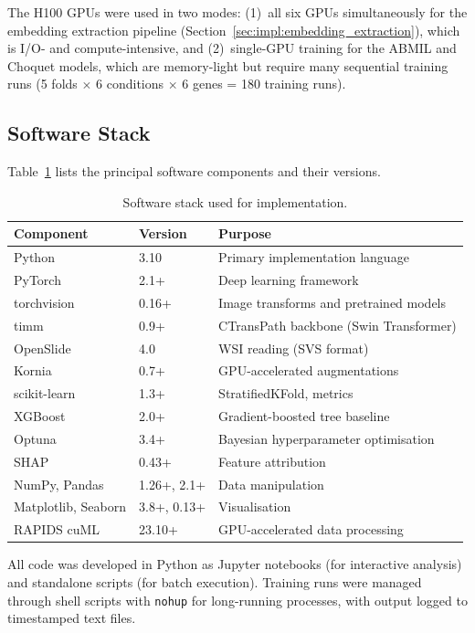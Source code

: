 The H100 GPUs were used in two modes: (1)~all six GPUs simultaneously for the embedding extraction pipeline (Section~\ref{sec:impl:embedding_extraction}), which is I/O- and compute-intensive, and (2)~single-GPU training for the ABMIL and Choquet models, which are memory-light but require many sequential training runs (5 folds $\times$ 6 conditions $\times$ 6 genes = 180 training runs).

\subsection{Software Stack}
\label{sec:impl:software}

Table~\ref{tab:software_stack} lists the principal software components and their versions.

\begin{table}[ht!]
\centering
\caption{Software stack used for implementation.}
\label{tab:software_stack}
\begin{tabular}{l l l}
\hline
\textbf{Component} & \textbf{Version} & \textbf{Purpose} \\
\hline
Python & 3.10 & Primary implementation language \\
PyTorch & 2.1+ & Deep learning framework \\
torchvision & 0.16+ & Image transforms and pretrained models \\
timm & 0.9+ & CTransPath backbone (Swin Transformer) \\
OpenSlide & 4.0 & WSI reading (SVS format) \\
Kornia & 0.7+ & GPU-accelerated augmentations \\
scikit-learn & 1.3+ & StratifiedKFold, metrics \\
XGBoost & 2.0+ & Gradient-boosted tree baseline \\
Optuna & 3.4+ & Bayesian hyperparameter optimisation \\
SHAP & 0.43+ & Feature attribution \\
NumPy, Pandas & 1.26+, 2.1+ & Data manipulation \\
Matplotlib, Seaborn & 3.8+, 0.13+ & Visualisation \\
RAPIDS cuML & 23.10+ & GPU-accelerated data processing \\
\hline
\end{tabular}
\end{table}

All code was developed in Python as Jupyter notebooks (for interactive analysis) and standalone scripts (for batch execution).
Training runs were managed through shell scripts with \texttt{nohup} for long-running processes, with output logged to timestamped text files.

